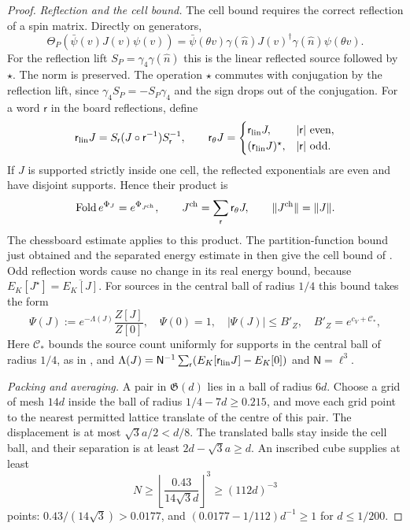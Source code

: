 \documentclass[11pt,letterpaper,reqno]{amsart}
\theoremstyle{definition}
\theoremstyle{remark}
\begin{document}
\begin{proof}
\emph{Reflection and the cell bound.}
The cell bound requires the correct reflection
of a spin matrix.  Directly on generators,
\[
 \Theta_P(\bar\psi(v)J(v)\psi(v))
  =\bar\psi(\theta v)\gamma(\hat n)J(v)^\dagger
                                  \gamma(\hat n)\psi(\theta v).
\]
For the reflection lift $S_P=\gamma_4\gamma(\hat n)$ this
is the linear reflected source followed by $\star$.
The norm is preserved. The operation $\star$ commutes
with conjugation by the reflection lift, since
$\gamma_4S_P=-S_P\gamma_4$ and the sign drops out of
the conjugation. For a word $\mathsf r$ in the board
reflections, define
\[
 \mathsf r_{\rm lin}J
 =S_{\mathsf r}(J\circ\mathsf r^{-1})S_{\mathsf r}^{-1},
 \qquad
 \mathsf r_\theta J=
 \begin{cases}
 \mathsf r_{\rm lin}J,&|\mathsf r|\text{ even},\\
 (\mathsf r_{\rm lin}J)^\star,&|\mathsf r|\text{ odd}.
 \end{cases}
\]
If $J$ is supported strictly inside one cell, the reflected
exponentials are even and have disjoint supports. Hence
their product is
\[
 \mathrm{Fold}\,e^{\Phi_J}=e^{\Phi_{J^{\rm ch}}},
 \qquad J^{\rm ch}=\sum_{\mathsf r}\mathsf r_\theta J,
 \qquad \|J^{\rm ch}\|=\|J\|.
\]
The chessboard estimate applies to this product. The
partition-function bound just obtained and the separated
energy estimate in \cite[Prop. 10.16]{QCDM1}
then give the cell bound of \cite[Prop. 10.17]{QCDM1}.
Odd reflection words cause no change in its real energy
bound, because $E_K[J^\star]=\overline{E_K[J]}$.
For sources in the central ball of radius $1/4$ this
bound takes the form
\begin{equation}\label{eq:qcdm2-current-cell-bound}
 \Psi(J):=e^{-\Lambda(J)}\frac{Z[J]}{Z[0]},
 \quad \Psi(0)=1,\quad |\Psi(J)|\le B'_Z,
 \quad B'_Z=e^{c_V+\mathscr C_*},
\end{equation}
Here $\mathscr C_*$ bounds the source count uniformly for
supports in the central ball of radius $1/4$, as in
\cite[Prop. 10.17]{QCDM1}, and
$\Lambda(J)=\mathsf N^{-1}\sum_{\mathsf r}
 (E_K[\mathsf r_{\rm lin}J]-E_K[0])$
and $\mathsf N=\ell^3$.

\emph{Packing and averaging.}
A pair in $\mathfrak G(d)$ lies in a ball of radius
$6d$. Choose a grid of mesh $14d$ inside the ball of
radius $1/4-7d\ge0.215$, and move each grid point to
the nearest permitted lattice translate of the centre
of this pair. The displacement is at most
$\sqrt3a/2<d/8$. The translated balls stay inside the
cell ball, and their separation is at least
$2d-\sqrt3a\ge d$. An inscribed cube supplies at least
\[
 N\ge\left\lfloor\frac{0.43}{14\sqrt3d}\right\rfloor^3
     \ge(112d)^{-3}
\]
points: $0.43/(14\sqrt3)>0.0177$, and
$(0.0177-1/112)d^{-1}\ge1$ for $d\le1/200$.


\end{proof}
\end{document}
